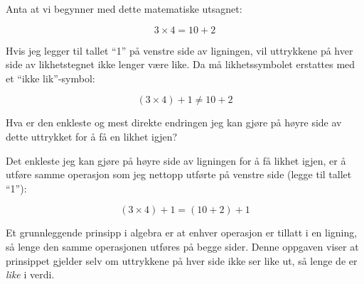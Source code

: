 

Anta at vi begynner med dette matematiske utsagnet:

$$3 \times 4 = 10 + 2$$

Hvis jeg legger til tallet ``1'' på venstre side av ligningen, vil uttrykkene på hver side av likhetstegnet ikke lenger være like. Da må likhetssymbolet erstattes med et ``ikke lik''-symbol:

$$(3 \times 4) + 1 \not = 10 + 2$$

Hva er den enkleste og mest direkte endringen jeg kan gjøre på høyre side av dette uttrykket for å få en likhet igjen?







Det enkleste jeg kan gjøre på høyre side av ligningen for å få likhet igjen, er å utføre samme operasjon som jeg nettopp utførte på venstre side (legge til tallet ``1''):

$$(3 \times 4) + 1 = (10 + 2) + 1$$







Et grunnleggende prinsipp i algebra er at enhver operasjon er tillatt i en ligning, så lenge den samme operasjonen utføres på begge sider. Denne oppgaven viser at prinsippet gjelder selv om uttrykkene på hver side ikke ser like ut, så lenge de er {\it like} i verdi.


